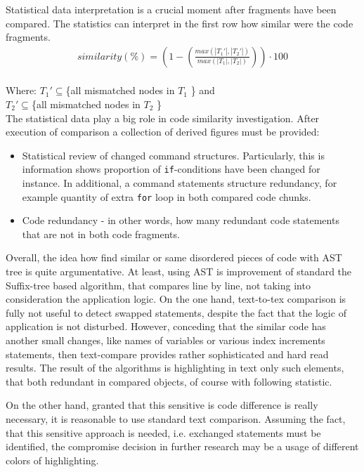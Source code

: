 \documentclass{report}
\begin{document}
Statistical data interpretation is a crucial moment after fragments have been compared. The statistics can interpret in the first row how similar were the code fragments. \\
\begin{gather*}
similarity(\%) =  \left ( 1 - \left (\frac{max(|T_{1}'|, |T_{2}'|)}{max(|T_{1}|, |T_{2}|)} \right ) \right )\cdot 100 
\end{gather*} \\
Where: $T_{1}' \subseteq $\{all mismatched nodes in $T_{1}$ \} and \\$T_{2}' \subseteq $\{all mismatched nodes in $T_{2}$ \}
\\
The statistical data play a big role in code similarity investigation. After execution of comparison a collection of derived figures must be provided:
\begin{itemize}
	\item Statistical review of changed command structures. Particularly, this is information shows proportion of \texttt{if}-conditions have been changed for instance. In additional, a command statements structure redundancy, for example quantity of extra \texttt{for} loop in both compared code chunks.
	\item Code redundancy - in other words, how many redundant code statements that are not in both code fragments.
	
\end{itemize}
Overall, the idea how find similar or same disordered pieces of code with AST tree is quite argumentative. At least, using AST is improvement of standard the Suffix-tree based algorithm, that compares line by line, not taking into consideration the application logic. On the one hand, text-to-tex comparison is fully not useful to detect swapped statements, despite the fact that the logic of application is not disturbed. 
However, conceding that the similar code has another small changes, like names of variables or various index increments statements, then text-compare provides rather sophisticated and hard read results. The result of the algorithms is highlighting in text only such elements, that both redundant in compared objects, of course with following statistic.

On the other hand, granted that this sensitive is code difference is really necessary, it is reasonable to use standard text comparison. Assuming the fact, that this sensitive approach is needed, i.e. exchanged statements must be identified, the compromise decision in further research  may be a usage of different colors of highlighting.
\end{document}
